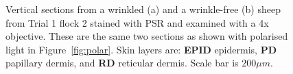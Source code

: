 %

\begin{figure}[!h]
\centering
\captionsetup{width=0.92\textwidth}
  \caption{Vertical sections from a wrinkled (a) and a wrinkle-free (b) sheep from Trial 1 flock 2 stained with PSR and examined with a 4x objective. These are the same two sections as shown with polarised light in Figure~\ref{fig:polar}. Skin layers are: {\bf EPID} epidermis, {\bf PD} papillary dermis, and {\bf RD} reticular dermis. Scale bar is $200\mu m$. }
\vfill
  \label{fig:nopolar}
\end{figure}

%

